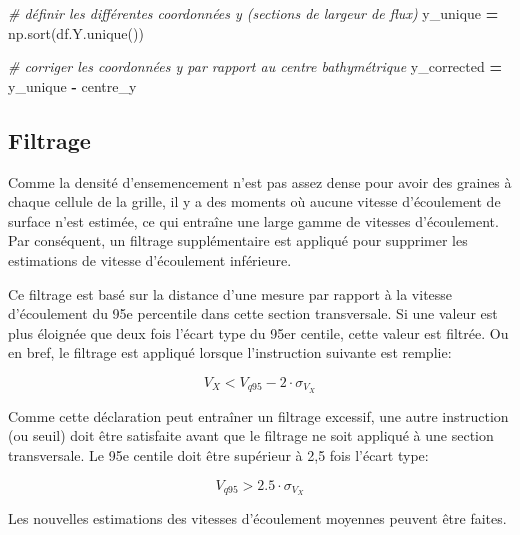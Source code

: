 \documentclass[
]{article}
\newenvironment{Shaded}{\begin{snugshade}}{\end{snugshade}}
\newcommand{\CommentTok}[1]{\textcolor[rgb]{0.56,0.35,0.01}{\textit{#1}}}
\newcommand{\NormalTok}[1]{#1}
\newcommand{\OperatorTok}[1]{\textcolor[rgb]{0.81,0.36,0.00}{\textbf{#1}}}
\begin{document}
\begin{Shaded}
\begin{Highlighting}[]
\CommentTok{\# définir les différentes coordonnées y (sections de largeur de flux)}
\NormalTok{y\_unique }\OperatorTok{=}\NormalTok{ np.sort(df.Y.unique())}
    
\CommentTok{\# corriger les coordonnées y par rapport au \textquotesingle{}centre\textquotesingle{} bathymétrique}
\NormalTok{y\_corrected }\OperatorTok{=}\NormalTok{ y\_unique }\OperatorTok{{-}}\NormalTok{ centre\_y}
\end{Highlighting}
\end{Shaded}

\hypertarget{filtrage}{%
\subsection*{Filtrage}\label{filtrage}}

Comme la densité d'ensemencement n'est pas assez dense pour avoir des graines à chaque cellule de la grille, il y a des moments où aucune vitesse d'écoulement de surface n'est estimée, ce qui entraîne une large gamme de vitesses d'écoulement. Par conséquent, un filtrage supplémentaire est appliqué pour supprimer les estimations de vitesse d'écoulement inférieure.

Ce filtrage est basé sur la distance d'une mesure par rapport à la vitesse d'écoulement du 95e percentile dans cette section transversale. Si une valeur est plus éloignée que deux fois l'écart type du 95er centile, cette valeur est filtrée. Ou en bref, le filtrage est appliqué lorsque l'instruction suivante est remplie:

\begin{equation}
V_{X} < V_{q95} - 2 \cdot \sigma_{V_{X}}
\end{equation}

Comme cette déclaration peut entraîner un filtrage excessif, une autre instruction (ou seuil) doit être satisfaite avant que le filtrage ne soit appliqué à une section transversale. Le 95e centile doit être supérieur à 2,5 fois l'écart type:

\begin{equation}
V_{q95} > 2.5 \cdot \sigma_{V_{X}}
\end{equation}

Les nouvelles estimations des vitesses d'écoulement moyennes peuvent être faites.
\end{document}

